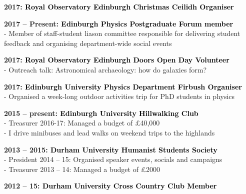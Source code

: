 \documentclass[a4paper,11pt,final]{memoir}
\newcommand{\SmallSep}{\vspace{0.5em}}
\newcommand{\CVItem}[1]
	{\textbf{\color{RoyalBlue} #1}}
\begin{document}
 \SmallSep
 
\CVItem{2017: \textcolor{black}{Royal Observatory Edinburgh Christmas Ceilidh Organiser}}

\SmallSep

\CVItem{2017 -- Present: \textcolor{black}{Edinburgh Physics Postgraduate Forum member}}\\
 - Member of staff-student liason committee responsible for delivering student feedback and organising department-wide social events

\SmallSep

\CVItem{2017: \textcolor{black}{Royal Observatory Edinburgh Doors Open Day Volunteer}}\\
 - Outreach talk: Astronomical archaeology: how do galaxies form?
 
 \SmallSep
 
\CVItem{2017: \textcolor{black}{Edinburgh University Physics Department Firbush Organiser}}\\
 - Organised a week-long outdoor activities trip for PhD students in physics
 
 \SmallSep

\CVItem{2015 -- present: \textcolor{black}{Edinburgh University Hillwalking Club}}\\
- Treasurer 2016-17: Managed a budget of \pounds40,000 \\
- I drive minibuses and lead walks on weekend trips to the highlands

\SmallSep

\CVItem{2013 -- 2015: \textcolor{black}{Durham University Humanist Students Society}}\\
 - President 2014 -- 15: Organised speaker events, socials and campaigns\\
 - Treasurer 2013 -- 14: Managed a budget of \pounds2000
 
 \SmallSep
 
\CVItem{2012 -- 15: \textcolor{black}{Durham University Cross Country Club Member}}
\end{document}
